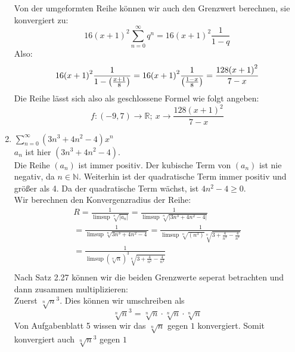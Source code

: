 \documentclass{article}
\begin{document}
\begin{enumerate}[ label= (\alph*) ]
        Von der umgeformten Reihe können wir auch den Grenzwert berechnen, sie konvergiert zu:
        \[
            16 {(x+1)}^{2} \sum_{n=0}^{\infty} {q}^n = 16 {(x+1)}^{2} \frac{1}{1 - q}
        \]
        Also:
        \[
            16 {(x+1)}^{2} \frac{1}{1 - \left( \frac{ {x+1} }{8} \right)} = 16 {(x+1)}^{2} \frac{1}{ \left( \frac{1-x}{8} \right) } \\
            = \frac{128 {(x+1)}^{2}}{7-x}
        \]
        Die Reihe lässt sich also als geschlossene Formel wie folgt angeben:
        \[
             f: (-9,7) \to \mathbb{R}; \ x \to \frac{128 {(x+1)}^{2}}{7-x}
        \]

        \item {\large \( \sum_{n=0}^{\infty} (3n^3 + 4n^2 -4)x^n \) } \\
        \(a_n\) ist hier \( (3n^3 + 4n^2 -4) \). \\
        Die Reihe \((a_n)\) ist immer positiv. Der kubische Term von \((a_n)\) ist nie negativ, da \(n \in \mathbb{N}\).
        Weiterhin ist der quadratische Term immer positiv und größer als 4.
        Da der quadratische Term wächst, ist \(4n^2 -4 \geq 0\). \\
        Wir berechnen den Konvergenzradius der Reihe:
        \begin{gather*}
            R = \frac{1}{ \limsup \sqrt[n]{|a_n|} } = \frac{1}{ \limsup \sqrt[n]{|3n^3 + 4n^2 -4|} } \\
            = \frac{1}{ \limsup \sqrt[n]{3n^3 + 4n^2 -4} } = \frac{1}{ \limsup \sqrt[n]{(n^3)} \sqrt[n]{3 + \frac{4}{n^2} - \frac{4}{n^3}} } \\
            = \frac{1}{ \limsup {\left( \sqrt[n]{n} \right)}^3 \sqrt[n]{3 + \frac{4}{n^2} - \frac{4}{n^3}} } \\
        \end{gather*}
        Nach Satz 2.27 können wir die beiden Grenzwerte seperat betrachten und dann zusammen multiplizieren: \\
        Zuerst \({\sqrt[n]{n}}^3\). Dies können wir umschreiben als
        \[ {\sqrt[n]{n}}^3 = \sqrt[n]{n} \cdot \sqrt[n]{n} \cdot \sqrt[n]{n} \]
        Von Aufgabenblatt 5 wissen wir das \(\sqrt[n]{n}\) gegen \(1\) konvergiert. Somit konvergiert auch \({\sqrt[n]{n}}^3\) gegen \(1\) \\


\end{enumerate}
\end{document}

